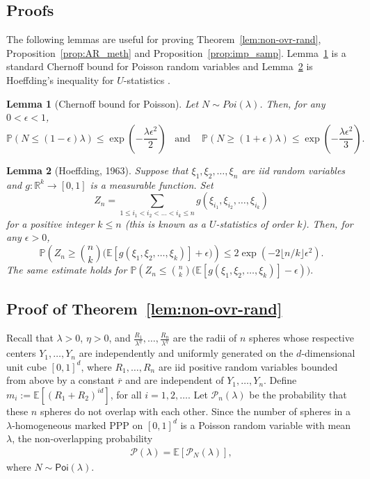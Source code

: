 \documentclass[11pt]{article}
\newcommand{\pp}{\mathbb{P}}
\newcommand{\ee}{\mathbb{E}}
\newcommand{\rbdd}{\overline{r}}
\newcommand{\reals}{\mathbb{R}}
\newcommand{\lt}{\left}
\newcommand{\rt}{\right}
\newcommand{\pois}{\mathsf{Poi}}
\newcommand{\pno}{\mathcal{P}(\lambda)}
\newcommand{\pnon}{\mathcal{P}_n(\lambda)}
\newtheorem{lemma}{Lemma}
\begin{document}
\begin{appendices}

\section{Proofs}
\label{Proofs}
The following lemmas are useful for proving Theorem~\ref{lem:non-ovr-rand}, Proposition~\ref{prop:AR_meth} and Proposition~\ref{prop:imp_samp}. Lemma~\ref{lemma:cherpoi} is a standard Chernoff bound for Poisson random variables and Lemma~\ref{lem:Hoeffding} is Hoeffding's inequality for $U$-statistics \cite{Hoe63}.

\begin{lemma}[Chernoff bound for Poisson]
\label{lemma:cherpoi}
Let $N \sim Poi(\lambda)$. Then, for  any $0 < \epsilon < 1$,
\[
 \pp\left( N \leq (1- \epsilon)\lambda \right) \leq \exp\lt( - \frac{\lambda \epsilon^2}{2}\rt)\,\,\, \text{  and  }\,\,\,\,\, \pp\left( N \geq (1 + \epsilon)\lambda \right) \leq \exp\lt( - \frac{\lambda \epsilon^2}{3} \rt).
\]
\end{lemma}
\begin{lemma}[Hoeffding, 1963]
\label{lem:Hoeffding}
 Suppose that $\xi_1, \xi_2, \dots, \xi_n$ are iid random variables and {$g:\reals^k \rightarrow [0,1]$ is a measurable function.}
 Set
 \[
 Z_n = \sum_{1 \leq i_1 < i_2< \dots < i_k \leq n} g\lt(\xi_{i_1}, \xi_{i_2}, \dots,\xi_{i_k}\rt)
 \] for a positive integer $k \leq n$ (this is known as {a $U$-statistics} of order $k$).
 Then, for any $\epsilon > 0$,
 \[
  \pp \lt(Z_n \geq {n \choose k} \Big(\ee[g(\xi_1,\xi_2,\dots,\xi_k)] + \epsilon\Big)\rt) \leq 2 \exp\lt(- 2 \lfloor n/k \rfloor \epsilon^2\rt).
 \]
 The same estimate holds for $\pp \lt(Z_n \leq {n \choose k} \Big(\ee[g(\xi_1,\xi_2,\dots,\xi_k)] - \epsilon\rt)\Big).$
\end{lemma}

\subsection{Proof of Theorem~\ref{lem:non-ovr-rand}}
\label{sec:LDResults}
Recall that $\lambda > 0$, $\eta > 0$, and  $\frac{R_1}{\lambda^\eta}, \dots, \frac{R_n}{\lambda^\eta}$ are the radii of $n$ spheres whose respective centers $Y_1, \dots, Y_n$ are independently and uniformly generated
on the $d$-dimensional unit cube $[0,1]^d$, where $R_1, \dots, R_n$ are iid positive random variables bounded from above by a constant $\rbdd$ and are independent of $Y_1, \dots, Y_n$. Define {$m_i := \ee\lt[(R_1 + R_2)^{id}\rt]$, for all $i  = 1, 2, \dots$.}
Let $\pnon$ be the probability that these $n$ spheres do not overlap with each other. Since the number of spheres in a $\lambda$-homogeneous marked PPP on $[0,1]^d$ is a Poisson random variable with mean $\lambda$,
the non-overlapping probability
\begin{align}
\label{eqn:pno_lam}
 \pno = \ee\lt[\mathcal{P}_N(\lambda)\rt],
\end{align}
where $N \sim \pois(\lambda)$.


\end{appendices}
\end{document}
